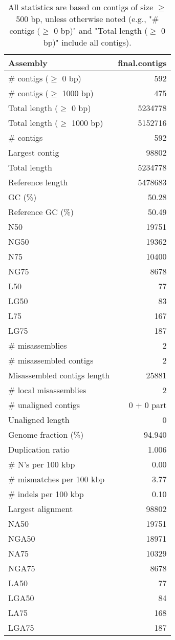 \documentclass[12pt,a4paper]{article}
\begin{document}
\begin{table}[ht]
\begin{center}
\caption{All statistics are based on contigs of size $\geq$ 500 bp, unless otherwise noted (e.g., "\# contigs ($\geq$ 0 bp)" and "Total length ($\geq$ 0 bp)" include all contigs).}
\begin{tabular}{|l*{1}{|r}|}
\hline
Assembly & final.contigs \\ \hline
\# contigs ($\geq$ 0 bp) & 592 \\ \hline
\# contigs ($\geq$ 1000 bp) & 475 \\ \hline
Total length ($\geq$ 0 bp) & 5234778 \\ \hline
Total length ($\geq$ 1000 bp) & 5152716 \\ \hline
\# contigs & 592 \\ \hline
Largest contig & 98802 \\ \hline
Total length & 5234778 \\ \hline
Reference length & 5478683 \\ \hline
GC (\%) & 50.28 \\ \hline
Reference GC (\%) & 50.49 \\ \hline
N50 & 19751 \\ \hline
NG50 & 19362 \\ \hline
N75 & 10400 \\ \hline
NG75 & 8678 \\ \hline
L50 & 77 \\ \hline
LG50 & 83 \\ \hline
L75 & 167 \\ \hline
LG75 & 187 \\ \hline
\# misassemblies & 2 \\ \hline
\# misassembled contigs & 2 \\ \hline
Misassembled contigs length & 25881 \\ \hline
\# local misassemblies & 2 \\ \hline
\# unaligned contigs & 0 + 0 part \\ \hline
Unaligned length & 0 \\ \hline
Genome fraction (\%) & 94.940 \\ \hline
Duplication ratio & 1.006 \\ \hline
\# N's per 100 kbp & 0.00 \\ \hline
\# mismatches per 100 kbp & 3.77 \\ \hline
\# indels per 100 kbp & 0.10 \\ \hline
Largest alignment & 98802 \\ \hline
NA50 & 19751 \\ \hline
NGA50 & 18971 \\ \hline
NA75 & 10329 \\ \hline
NGA75 & 8678 \\ \hline
LA50 & 77 \\ \hline
LGA50 & 84 \\ \hline
LA75 & 168 \\ \hline
LGA75 & 187 \\ \hline
\end{tabular}
\end{center}
\end{table}
\end{document}
